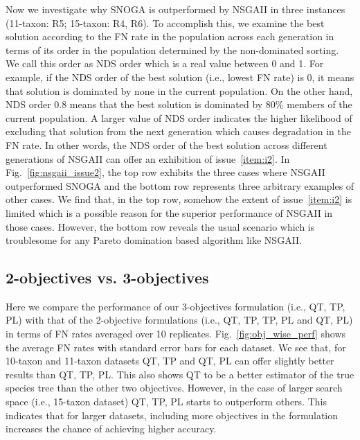 Now we investigate why SNOGA is outperformed by NSGAII in three instances (11-taxon: R5; 15-taxon: R4, R6). To accomplish this, we examine the best solution according to the FN rate in the population across each generation in terms of its order in the population determined by the non-dominated sorting. We call this order as NDS order which is a real value between 0 and 1. For example, if the NDS order of the best solution (i.e., lowest FN rate) is 0, it means that solution is dominated by none in the current population. On the other hand, NDS order 0.8 means that the best solution is dominated by 80\% members of the current population. A larger value of NDS order indicates the higher likelihood of excluding that solution from the next generation which causes degradation in the FN rate. In other words, the NDS order of the best solution across different generations of NSGAII can offer an exhibition of issue~\ref{item:i2}. In Fig.~\ref{fig:nsgaii_issue2}, the top row exhibits the three cases where NSGAII outperformed SNOGA and the bottom row represents three arbitrary examples of other cases. We find that, in the top row, somehow the extent of issue~\ref{item:i2} is limited which is a possible reason for the superior performance of NSGAII in those cases. However, the bottom row reveals the usual scenario which is troublesome for any Pareto domination based algorithm like NSGAII. 

\subsection{2-objectives vs. 3-objectives}
Here we compare the performance of our 3-objectives formulation (i.e., {QT, TP, PL}) with that of the 2-objective formulations (i.e., {QT, TP}, {TP, PL} and {QT, PL}) in terms of FN rates averaged over 10 replicates. Fig.~\ref{fig:obj_wise_perf} shows the average FN rates with standard error bars for each dataset. We see that, for 10-taxon and 11-taxon datasets {QT, TP} and {QT, PL} can offer slightly better results than {QT, TP, PL}. This also shows QT to be a better estimator of the true species tree than the other two objectives. However, in the case of larger search space (i.e., 15-taxon dataset) {QT, TP, PL} starts to outperform others. This indicates that for larger datasets, including more objectives in the formulation increases the chance of achieving higher accuracy.

